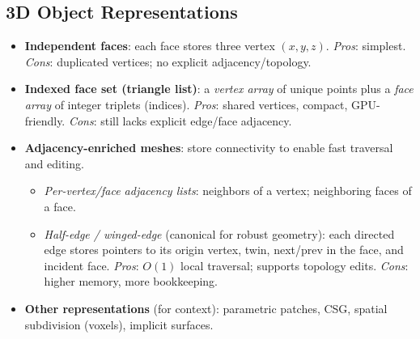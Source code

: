 \documentclass[8pt,twocolumn]{extarticle}
\begin{document}
\subsection*{3D Object Representations}
\begin{itemize}
  \item \textbf{Independent faces}: each face stores three vertex \((x,y,z)\). \emph{Pros}: simplest. \emph{Cons}: duplicated vertices; no explicit adjacency/topology.
  \item \textbf{Indexed face set (triangle list)}: a \emph{vertex array} of unique points plus a \emph{face array} of integer triplets (indices). \emph{Pros}: shared vertices, compact, GPU-friendly. \emph{Cons}: still lacks explicit edge/face adjacency.
  \item \textbf{Adjacency-enriched meshes}: store connectivity to enable fast traversal and editing.
    \begin{itemize}
      \item \emph{Per-vertex/face adjacency lists}: neighbors of a vertex; neighboring faces of a face.
      \item \emph{Half-edge / winged-edge} (canonical for robust geometry): each directed edge stores pointers to its origin vertex, twin, next/prev in the face, and incident face. \emph{Pros}: \(O(1)\) local traversal; supports topology edits. \emph{Cons}: higher memory, more bookkeeping.
    \end{itemize}
  \item \textbf{Other representations} (for context): parametric patches, CSG, spatial subdivision (voxels), implicit surfaces.
\end{itemize}
\end{document}
